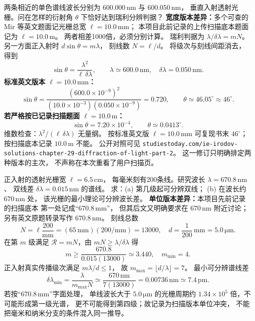 两条相近的单色谱线波长分别为
$600.000\,\mathrm{nm}$ 与 $600.050\,\mathrm{nm}$，
垂直入射透射光栅。问在怎样的衍射角
$\theta$ 下恰好达到瑞利分辨判据？
\textbf{宽度版本差异：}多个可查的 Mir 等英文题面记光栅总宽
$\ell=10.0\,\mathrm{mm}$；
本项目此前记录的上传扫描底本题面记为
$\ell=10.0\,\mathrm m$。
两者相差1000倍，必须分别计算。
\exsolution
瑞利判据为 $\lambda/\delta\lambda=mN$。
另一方面正入射时 $d\sin\theta=m\lambda$，
刻线数 $N=\ell/d$。
将级次与刻线间距消去，得到
\[
 \boxed{\sin\theta
 =\frac{\lambda^2}{\ell\,\delta\lambda}},
 \qquad
 \lambda\simeq600.0\,\mathrm{nm},\quad
 \delta\lambda=0.050\,\mathrm{nm}.
\]
\textbf{标准英文版本 $\ell=10.0\,\mathrm{mm}$：}
\[
 \sin\theta=\frac{(600.0\times10^{-9})^2}
 {(10.0\times10^{-3})(0.050\times10^{-9})}
 =0.720,
 \qquad
 \boxed{\theta\simeq46.05^\circ\approx46^\circ}.
\]
\textbf{若严格按已记录扫描题面
$\ell=10.0\,\mathrm m$：}
\[
 \sin\theta=7.20\times10^{-4},\qquad
 \boxed{\theta\simeq0.0413^\circ}.
\]
\excheck
维数检查：$\lambda^2/(\ell\,\delta\lambda)$ 无量纲。
按标准英文版 $\ell=10.0\,\mathrm{mm}$ 可复现书末
$46^\circ$；按扫描底本记录 $10.0\,\mathrm m$ 不能。
公开对照可见
\texttt{studiestoday.com/ie-irodov-solutions-chapter-29-diffraction-of-light-part-2}。
这一修订只明确排定两种版本的主次，
不声称在本次重看了用户扫描页。

正入射的透射光栅宽 $\ell=6.5\,\mathrm{cm}$，
每毫米刻有200条线。研究波长
$\lambda=670.8\,\mathrm{nm}$、
双线差 $\delta\lambda=0.015\,\mathrm{nm}$ 的谱线。
求：(a) 第几级起可分辨双线；
(b) 在波长约 $670\,\mathrm{nm}$ 处，
该光栅的最小理论可分辨波长差。
\textbf{单位版本差异：}本项目先前记录的扫描底本
第一处记成“$670.8\,\mathrm{mm}$”，
但其后文又明确要求在 $670\,\mathrm{nm}$ 附近讨论；
另有英文原题转录写作 $670.8\,\mathrm{nm}$。
\exsolution
刻线总数
\[
 N=\ell\frac{200}{\mathrm{mm}}
 =(65\,\mathrm{mm})(200/\mathrm{mm})
 =13000,
 \quad
 d=\frac{1}{200}\,\mathrm{mm}=5.0\,\mathrm{\mu m}.
\]
在第 $m$ 级满足 $\mathcal R=mN$，由
$mN\ge\lambda/\delta\lambda$ 得
\[
 m\ge\frac{670.8}{0.015(13000)}
 \simeq3.440,
 \quad\boxed{m_{\min}=4}.
\]
正入射真实传播级次满足
$m\lambda/d\le1$，
故 $m_{\max}=\lfloor d/\lambda\rfloor=7$。
最小可分辨谱线差
\[
 \boxed{\delta\lambda_{\min}
 =\frac{\lambda}{m_{\max}N}
 \simeq\frac{670\,\mathrm{nm}}{7(13000)}
 =0.00736\,\mathrm{nm}
 \simeq7.4\,\mathrm{pm}}.
\]
\excheck
若按“$670.8\,\mathrm{mm}$”字面处理，
单线波长大于 $5.0\,\mathrm{\mu m}$ 的光栅周期约
$1.34\times10^5$ 倍，不可能形成第一级光谱，
更不可能得到第四级；故记录为扫描版本单位冲突，
不能把毫米和纳米分支的条件混入同一推导。

